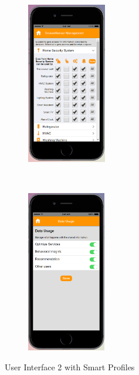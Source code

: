 \begin{figure}[htb]
\begin{subfigure}[t]{0.2\textwidth}
	\end{subfigure}%
	~~~~~
	\begin{subfigure}[t]{0.2\textwidth}
		\centering
		\includegraphics[height=2.8in]{figures/ui2sp4.png}
	\end{subfigure}%
	~~~~~
	\begin{subfigure}[t]{0.2\textwidth}
		\centering
		\includegraphics[height=2.8in]{figures/ui2sp5.png}
	\end{subfigure}%
	\caption{User Interface 2 with Smart Profiles}
	\label{fig:ui2Profiles}
\end{figure}
